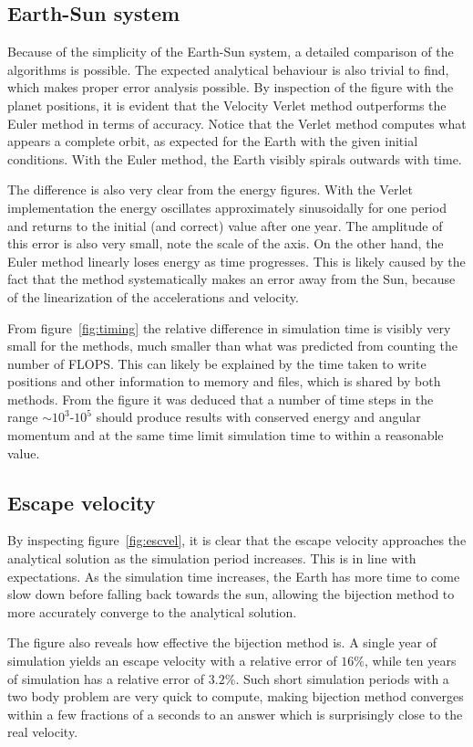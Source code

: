 \documentclass[aps,reprint]{revtex4-1}
\begin{document}
\subsection{Earth-Sun system}
Because of the simplicity of the Earth-Sun system, a detailed comparison of the
algorithms is possible. The expected analytical behaviour is also trivial to
find, which makes proper error analysis possible. By inspection of the figure with the
planet positions, it is evident that the Velocity Verlet method outperforms
the Euler method in terms of accuracy. Notice that the Verlet method computes what
appears a complete orbit, as expected for the Earth with the given initial conditions.
With the Euler method, the Earth visibly spirals outwards with time.

The difference is also very clear from the energy figures. With the Verlet
implementation the energy oscillates approximately sinusoidally for one period
and returns to the initial (and correct) value after one year. The amplitude of
this error is also very small, note the scale of the axis.
On the other hand, the Euler method linearly loses energy as time progresses. This
is likely caused by the fact that the method systematically makes an error away
from the Sun, because of the linearization of the accelerations and velocity.

From figure~\ref{fig:timing} the relative difference in simulation time is visibly
very small for the methods, much smaller than what was predicted from counting
the number of FLOPS. This can likely be explained by the time taken to write
positions and other information to memory and files, which is shared by both methods.
From the figure it was
deduced that a number of time steps in the range $\sim 10^3$-$10^5$ should produce
results with conserved energy and angular momentum and at the same time limit
simulation time to within a reasonable value.

\subsection{Escape velocity}
By inspecting figure~\ref{fig:escvel}, it is clear that the escape velocity
approaches the analytical solution as the simulation period increases. This is
in line with expectations. As the simulation time increases, the Earth has more
time to come slow down before falling back towards the sun, allowing the
bijection method to more accurately converge to the analytical solution.

The figure also reveals how effective the bijection method is. A single year of
simulation yields an escape velocity with a relative error of \(16\%\), while
ten years of simulation has a relative error of \(3.2\%\). Such short simulation
periods with a two body problem are very quick to compute, making bijection
method converges within a few fractions of a seconds to an answer which is
surprisingly close to the real velocity. 
\end{document}
